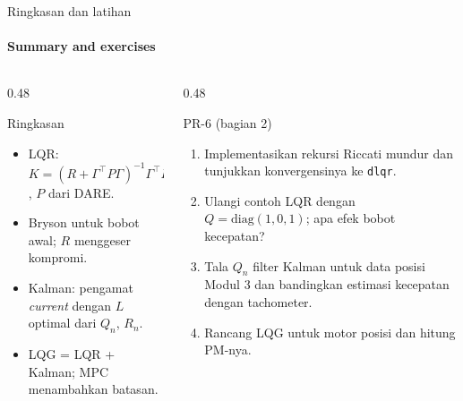 \documentclass[aspectratio=169,10pt]{beamer}
\begin{document}
\begin{frame}{Ringkasan dan latihan}
	\framesubtitle{Summary and exercises}
	\begin{columns}[T]
		\begin{column}{0.48\textwidth}
			\begin{block}{Ringkasan}
				\small
				\begin{itemize}
					\item LQR: $K = (R+\Gamma^\top P\Gamma)^{-1}\Gamma^\top P\Phi$, $P$ dari DARE.
					\item Bryson untuk bobot awal; $R$ menggeser kompromi.
					\item Kalman: pengamat \textit{current} dengan $L$ optimal dari $Q_n$, $R_n$.
					\item LQG = LQR + Kalman; MPC menambahkan batasan.
				\end{itemize}
			\end{block}
		\end{column}
		\begin{column}{0.48\textwidth}
			\begin{exampleblock}{PR-6 (bagian 2)}
				\small
				\begin{enumerate}
					\item Implementasikan rekursi Riccati mundur dan tunjukkan konvergensinya ke \texttt{dlqr}.
					\item Ulangi contoh LQR dengan $Q = \text{diag}(1, 0{,}1)$; apa efek bobot kecepatan?
					\item Tala $Q_n$ filter Kalman untuk data posisi Modul 3 dan bandingkan estimasi kecepatan dengan tachometer.
					\item Rancang LQG untuk motor posisi dan hitung PM-nya.
				\end{enumerate}
			\end{exampleblock}
		\end{column}
	\end{columns}
\end{frame}
\end{document}
